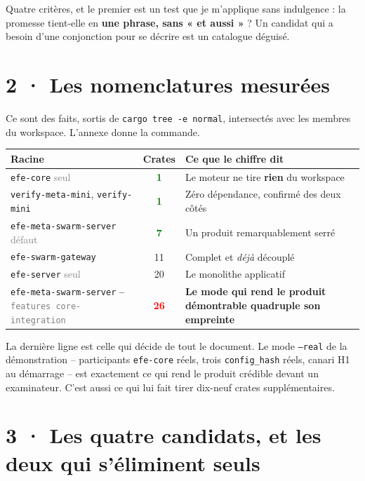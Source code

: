 \documentclass[10pt]{article}
\newcommand{\best}[1]{\textcolor{green}{\textbf{#1}}}
\newcommand{\pire}[1]{\textcolor{red}{\textbf{#1}}}
\newcommand{\sz}[1]{\textcolor{grey}{\small\textsf{#1}}}
\newcommand{\code}[1]{\texttt{\small #1}}
\begin{document}
Quatre critères, et le premier est un test que je m'applique sans indulgence : la promesse tient-elle en
\textbf{une phrase, sans « et aussi »} ? Un candidat qui a besoin d'une conjonction pour se décrire est
un catalogue déguisé.

\section{2 · Les nomenclatures mesurées}

Ce sont des faits, sortis de \code{cargo tree -e normal}, intersectés avec les membres du workspace.
L'annexe donne la commande.

\renewcommand{\arraystretch}{1.16}
\begin{center}\small
\begin{tabular}{@{}>{\raggedright\arraybackslash}p{6.2cm} c >{\raggedright\arraybackslash}p{8.2cm}@{}}
\toprule
\textbf{Racine} & \textbf{Crates} & \textbf{Ce que le chiffre dit} \\
\midrule
\code{efe-core} \sz{seul} & \best{1} & Le moteur ne tire \textbf{rien} du workspace \\
\code{verify-meta-mini}, \code{verify-mini} & \best{1} & Zéro dépendance, confirmé des deux côtés \\
\code{efe-meta-swarm-server} \sz{défaut} & \best{7} & Un produit remarquablement serré \\
\code{efe-swarm-gateway} & 11 & Complet et \emph{déjà} découplé \\
\code{efe-server} \sz{seul} & 20 & Le monolithe applicatif \\
\code{efe-meta-swarm-server} \sz{\code{--features core-integration}} & \pire{26} & \textbf{Le mode qui rend le produit démontrable quadruple son empreinte} \\
\bottomrule
\end{tabular}
\end{center}

La dernière ligne est celle qui décide de tout le document. Le mode \code{--real} de la démonstration --
participants \code{efe-core} réels, trois \code{config\_hash} réels, canari H1 au démarrage -- est
exactement ce qui rend le produit crédible devant un examinateur. C'est aussi ce qui lui fait tirer
dix-neuf crates supplémentaires.

\section{3 · Les quatre candidats, et les deux qui s'éliminent seuls}
\end{document}
